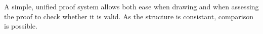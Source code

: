A simple, unified proof system allows both ease when drawing and when assessing the proof to check whether it is valid. As the structure is consistant, comparison is possible.







